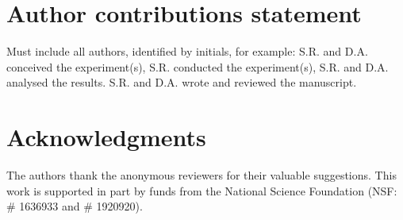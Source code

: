\documentclass[unnumsec,webpdf,contemporary,large]{oup-authoring-template}%
\theoremstyle{thmstyleone}%
\theoremstyle{thmstyletwo}%
\theoremstyle{thmstylethree}%
\begin{document}
\section{Author contributions statement}

Must include all authors, identified by initials, for example:
S.R. and D.A. conceived the experiment(s),  S.R. conducted the experiment(s), S.R. and D.A. analysed the results.  S.R. and D.A. wrote and reviewed the manuscript.

\section{Acknowledgments}
The authors thank the anonymous reviewers for their valuable suggestions. This work is supported in part by funds from the National Science Foundation (NSF: \# 1636933 and \# 1920920).










\end{document}
